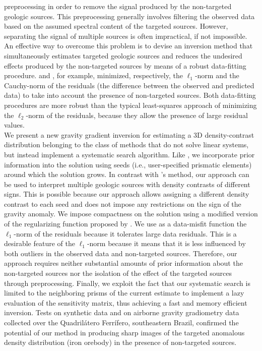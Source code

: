preprocessing in order to remove the signal
produced by the non-targeted geologic sources.
This preprocessing generally involves filtering the observed data based on the
assumed spectral content of the targeted sources.
However, separating the signal of multiple
sources is often impractical, if not impossible.
An effective way to overcome this problem is to devise an inversion method that
simultaneously estimates targeted geologic sources and
reduces the undesired effects
produced by the non-targeted sources by means of a robust data-fitting
procedure.
\citet{silva_holmann} and \citet{silva_cutrim}, for example, minimized,
respectively, the $\ell_1$-norm and the Cauchy-norm of the residuals (the
difference between the observed and predicted data) to take into account the
presence of non-targeted sources.
Both data-fitting procedures are more robust than the typical least-squares
approach of minimizing the $\ell_2$-norm of the residuals, because they allow
the presence of large residual values.
\\ \indent
We present a new gravity gradient inversion for estimating a 3D density-contrast
distribution belonging to the class of methods that do not solve linear systems,
but instead implement a systematic search algorithm.
Like \citet{rene}, we incorporate prior information into the solution using
seeds (i.e., user-specified prismatic elements) around which the solution grows.
In contrast with \citeauthor{rene}'s \citeyearpar{rene} method, our approach can
be used to interpret multiple geologic sources with density contrasts of
different signs. This is possible because our approach allows
assigning a different density contrast to each seed and does not impose
any restrictions on the sign of the gravity anomaly.
We impose compactness on the solution using a modified version of the
regularizing function proposed by \citet{silvadias09}.
We use as a data-misfit function the
$\ell_1$-norm of the residuals because
it tolerates large data residuals.
This is a desirable feature of the $\ell_1$-norm because it means that it
is less influenced by both outliers in the observed data and non-targeted
sources.
Therefore, our approach requires neither substantial amounts of prior
information about the
non-targeted sources nor the isolation
of the effect of the targeted sources through preprocessing.
Finally, we exploit the fact that our systematic search is limited to the
neighboring prisms of the current estimate to implement a lazy evaluation
\citep{lazyeval} of the
sensitivity matrix, thus achieving a fast and memory efficient inversion.
Tests on synthetic data and on airborne gravity gradiometry data collected over
the Quadril\'atero Ferr\'ifero, southeastern Brazil, confirmed the potential of
our method in producing sharp images of the targeted anomalous density
distribution (iron orebody) in the presence of non-targeted sources.


